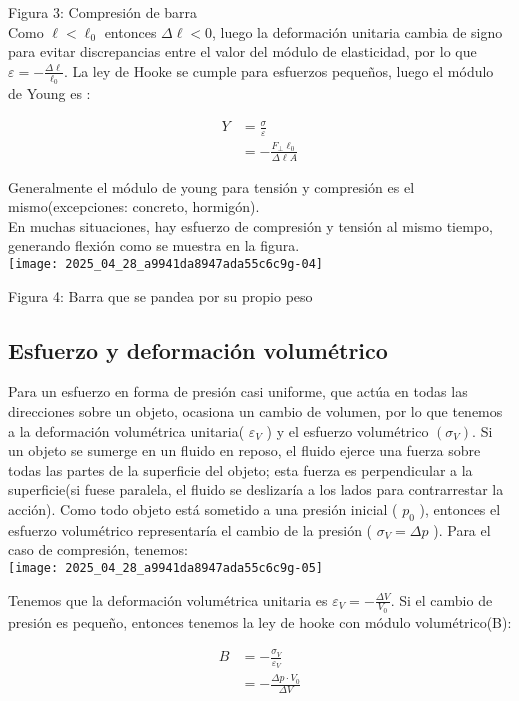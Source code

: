 Figura 3: Compresión de barra\\
Como $\ell<\ell_{0}$ entonces $\Delta \ell<0$, luego la deformación unitaria cambia de signo para evitar discrepancias entre el valor del módulo de elasticidad, por lo que $\varepsilon=-\frac{\Delta \ell}{\ell_{0}}$. La ley de Hooke se cumple para esfuerzos pequeños, luego el módulo de Young es :

$$
\begin{aligned}
Y & =\frac{\sigma}{\varepsilon} \\
& =-\frac{F_{\perp} \ell_{0}}{\Delta \ell A}
\end{aligned}
$$

Generalmente el módulo de young para tensión y compresión es el mismo(excepciones: concreto, hormigón).\\
En muchas situaciones, hay esfuerzo de compresión y tensión al mismo tiempo, generando flexión como se muestra en la figura.\\
\texttt{[image: 2025\_04\_28\_a9941da8947ada55c6c9g-04]}

Figura 4: Barra que se pandea por su propio peso

\subsection{Esfuerzo y deformación volumétrico}
Para un esfuerzo en forma de presión casi uniforme, que actúa en todas las direcciones sobre un objeto, ocasiona un cambio de volumen, por lo que tenemos a la deformación volumétrica unitaria( $\varepsilon_{V}$ ) y el esfuerzo volumétrico $\left(\sigma_{V}\right)$. Si un objeto se sumerge en un fluido en reposo, el fluido ejerce una fuerza sobre todas las partes de la superficie del objeto; esta fuerza es perpendicular a la superficie(si fuese paralela, el fluido se deslizaría a los lados para contrarrestar la acción). Como todo objeto está sometido a una presión inicial ( $p_{0}$ ), entonces el esfuerzo volumétrico representaría el cambio de la presión ( $\sigma_{V}=\Delta p$ ). Para el caso de compresión, tenemos:\\
\texttt{[image: 2025\_04\_28\_a9941da8947ada55c6c9g-05]}

Tenemos que la deformación volumétrica unitaria es $\varepsilon_{V}=-\frac{\Delta V}{V_{0}}$. Si el cambio de presión es pequeño, entonces tenemos la ley de hooke con módulo volumétrico(B):

$$
\begin{aligned}
B & =-\frac{\sigma_{V}}{\varepsilon_{V}} \\
& =-\frac{\Delta p \cdot V_{0}}{\Delta V}
\end{aligned}
$$

